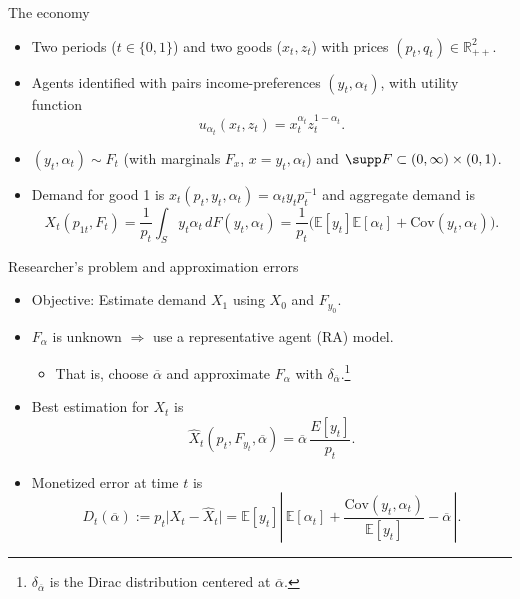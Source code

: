\documentclass[10pt, handout]{beamer}
\begin{document}
\begin{frame}{The economy}
	\vfill
	\begin{itemize}
		\item Two periods ($t \in \{0,1\}$) and two goods ($x_{t}, z_{t}$) with prices $(p_{t},q_{t}) \in \mathbb{R}^{2}_{++}$. \vfill
		
		\item Agents identified with pairs income-preferences $(y_{t},\alpha_{t})$, with utility function\vspace{1ex}
				$$u_{\alpha_{t}}(x_{t}, z_{t}) = x_{t}^{\alpha_{t}}z_{t}^{1-\alpha_{t}}.$$\vfill
		
		\item $(y_{t},\alpha_{t}) \sim F_{t}$ (with marginals $F_{x}$, $x = y_{t},\alpha_{t}$) and $\supp F \subset (0,\infty) \times (0,1)$.\vfill
		
		\item Demand for good 1 is $x_{t}(p_{t}, y_{t} ,\alpha_{t}) = \alpha_{t} y_{t} p_{t}^{-1}$ and aggregate demand is\vspace{1ex}
				$$X_{t}(p_{1t}, F_{t}) 
					= \frac{1}{p_{t}} \int_{S} y_{t}\alpha_{t} \, dF(y_{t},\alpha_{t}) 
					= \frac{1}{p_{t}}\Big(\mathbb{E}[y_{t}]\mathbb{E}[\alpha_{t}] + \mathrm{Cov}(y_{t},\alpha_{t})\Big).$$\vfill
	\end{itemize}
\end{frame}

\begin{frame}{Researcher's problem and approximation errors}
	\vfill
	\begin{itemize}
		\item Objective: Estimate demand $X_{1}$ using $X_{0}$ and $F_{y_{0}}$.\vfill
		
		\item $F_{\alpha}$ is unknown $\Rightarrow$ use a representative agent (RA) model.\vspace{1ex}
			\begin{itemize}
				\item That is, choose $\overline{\alpha}$ and approximate $F_{\alpha}$ with $\delta_{\overline{\alpha}}$.\footnote[frame]{$\delta_{\overline{\alpha}}$ is the Dirac distribution centered at $\overline{\alpha}$.}
			\end{itemize} \vfill
			
		\item Best estimation for $X_{t}$ is\vspace{1ex}
				$$\widehat{X}_{t}(p_{t}, F_{y_{t}}, \overline{\alpha}) = \overline{\alpha}\, \frac{E[y_{t}]}{p_{t}}.$$
			\vfill
				
		\item Monetized error at time $t$ is\vspace{1ex}
				$$D_{t}(\overline{\alpha}) 
		 			:=	p_{t}\Big| X_{t} - \widehat{X}_{t}\Big|
					=	\mathbb{E}[y_{t}]\left|\, \mathbb{E}[\alpha_{t}] + \frac{\mathrm{Cov}(y_{t},\alpha_{t})}{\mathbb{E}[y_{t}]} - \overline{\alpha}\,\right|.$$
	\end{itemize} \vfill

\end{frame}
\end{document}
